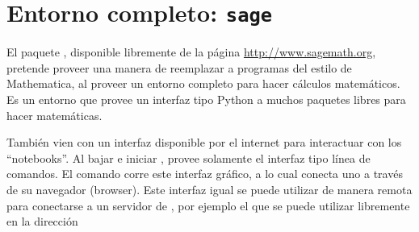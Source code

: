 \section{Entorno completo: \texttt{sage}}
El paquete , disponible libremente de la página \url{http://www.sagemath.org}, pretende proveer una manera de reemplazar a programas del estilo de Mathematica, al proveer un entorno completo para hacer cálculos matemáticos. Es un entorno que provee un interfaz tipo Python a muchos paquetes libres para hacer matemáticas.  

También vien con un interfaz disponible por el internet para interactuar con los ``notebooks''.
Al bajar e iniciar , provee solamente el interfaz tipo línea de comandos. El comando  corre este interfaz gráfico, a lo cual conecta uno a través de su navegador (browser). Este interfaz igual se puede utilizar de manera remota para conectarse a un servidor de , por ejemplo el que se puede utilizar libremente en la dirección  






